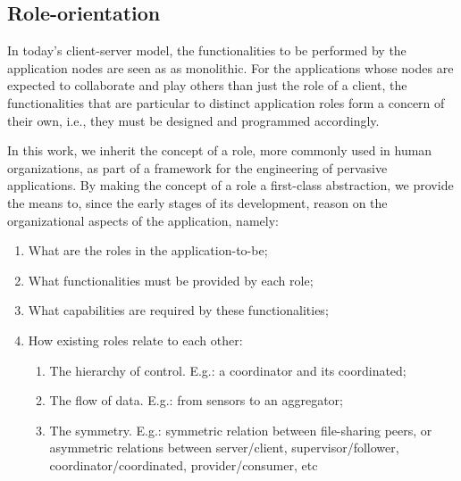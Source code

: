 


\subsection{Role-orientation}


In today's client-server model, the functionalities to be performed by the application nodes are seen as as monolithic. For the applications whose nodes are expected to collaborate and play others than just the role of a client, the functionalities that are particular to distinct application roles form a concern of their own, i.e., they must be designed and programmed accordingly. 

In this work, we inherit the concept of a role, more commonly used in human organizations, as part of a framework for the engineering of pervasive applications. By making the concept of a role a first-class abstraction, we provide the means to, since the early stages of its development, reason on the organizational aspects of the application, namely:

\begin{enumerate}[label=\roman*]
	
	\item What are the roles in the application-to-be;
	
	\item What functionalities must be provided by each role;
	
	\item What capabilities are required by these functionalities; 
	
	
	\item How existing roles relate to each other: 
	
	\begin{enumerate}[label=-]
		
		\item The hierarchy of control. E.g.: a coordinator and its coordinated;
		
		\item The flow of data. E.g.: from sensors to an aggregator;
	
		\item The symmetry. E.g.: symmetric relation between file-sharing peers, or asymmetric relations between server/client, supervisor/follower, coordinator/coordinated, provider/consumer, etc
		
	\end{enumerate}	
	
\end{enumerate}

